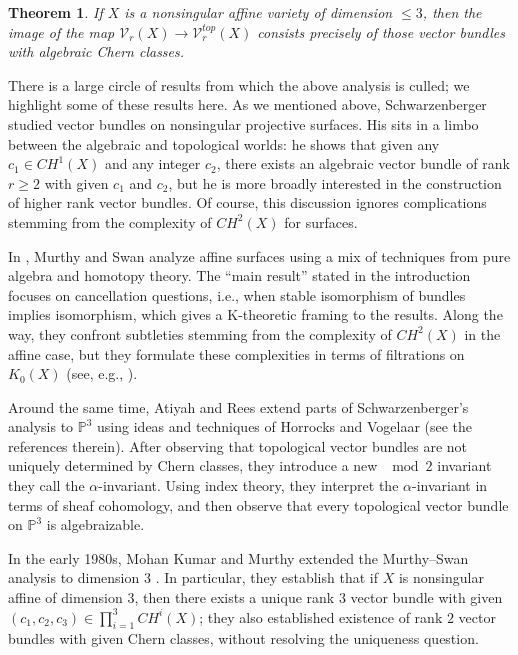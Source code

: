 \documentclass[11pt,leqno]{article}
\renewcommand{\1}{{\rm 1\hspace*{-0.4ex}%
\rule{0.1ex}{1.52ex}\hspace*{0.2ex}}}
\newcommand{\<}[1]{{\langle}#1 {\rangle}}
\newcounter{intro}
\theoremstyle{plain}
\newtheorem{theorem}{Theorem}[subsection]
\theoremstyle{definition}
\theoremstyle{remark}
\numberwithin{equation}{subsection}
\begin{document}
\begin{theorem}
	If $X$ is a nonsingular affine variety of dimension $\leq 3$, then the image of the map $\mathscr{V}_r(X) \to \mathscr{V}_r^{top}(X)$ consists precisely of those vector bundles with algebraic Chern classes.
\end{theorem}

There is a large circle of results from which the above analysis is culled; we highlight some of these results here.  As we mentioned above, Schwarzenberger studied vector bundles on nonsingular projective surfaces.  His \cite[Theorem 8]{Schwarzenberger1961VectorBundles} sits in a limbo between the algebraic and topological worlds: he shows that given any $c_1 \in CH^1(X)$ and any integer $c_2$, there exists an algebraic vector bundle of rank $r \geq 2$ with given $c_1$ and $c_2$, but he is more broadly interested in the construction of higher rank vector bundles.  Of course, this discussion ignores complications stemming from the complexity of $CH^2(X)$ for surfaces. 

In \cite{MurthySwan1976VectorBundlesAffineSurfaces}, Murthy and Swan analyze affine surfaces using a mix of techniques from pure algebra and homotopy theory.  The ``main result'' stated in the introduction focuses on cancellation questions, i.e., when stable isomorphism of bundles implies isomorphism, which gives a K-theoretic framing to the results.  Along the way, they confront subtleties stemming from the complexity of $CH^2(X)$ in the affine case, but they formulate these complexities in terms of filtrations on $K_0(X)$ (see, e.g.,  \cite[Theorem 4.2]{MurthySwan1976VectorBundlesAffineSurfaces}).

Around the same time, Atiyah and Rees \cite{AtiyahRees1976VectorBundlesP3} extend parts of Schwarzenberger's analysis to ${\mathbb P}^3$ using ideas and techniques of Horrocks and Vogelaar (see the references therein).  After observing that topological vector bundles are not uniquely determined by Chern classes, they introduce a new $\mod 2$ invariant they call the $\alpha$-invariant.  Using index theory, they interpret the $\alpha$-invariant in terms of sheaf cohomology, and then observe that every topological vector bundle on ${\mathbb P}^3$ is algebraizable.  

In the early 1980s, Mohan Kumar and Murthy extended the Murthy--Swan analysis to dimension $3$ \cite{KumarMurthy1982AlgebraicCyclesAffineThreefolds}.  In particular, they establish that if $X$ is nonsingular affine of dimension $3$, then there exists a unique rank $3$ vector bundle with given $(c_1,c_2,c_3) \in \prod_{i=1}^3 CH^i(X)$; they also established existence of rank $2$ vector bundles with given Chern classes, without resolving the uniqueness question.
\end{document}
